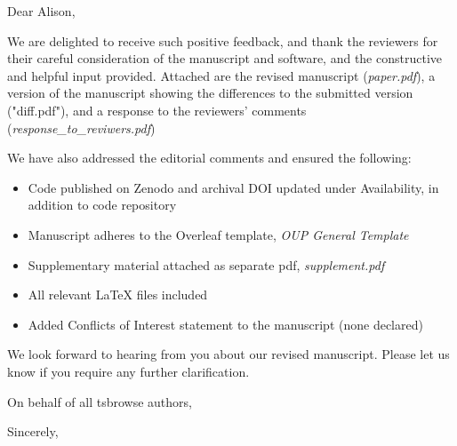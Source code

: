 \documentclass{letter}
\begin{document}
\begin{letter}{}

\opening{Dear Alison,}

We are delighted to receive such positive feedback, and thank the reviewers for their 
careful consideration of the manuscript and software, and the constructive and helpful 
input provided. Attached are the revised manuscript (\textit{paper.pdf}), 
a version of the manuscript showing the differences to the submitted version ("diff.pdf"), 
and a response to the reviewers' comments (\textit{response\_to\_reviwers.pdf})

We have also addressed the editorial comments and ensured the following:
\begin{itemize}
    \item Code published on Zenodo and archival DOI updated 
    under Availability, in addition to code repository
    \item Manuscript adheres to the Overleaf template, \textit{OUP General Template}
    \item Supplementary material attached as separate pdf, \textit{supplement.pdf}
    \item All relevant LaTeX files included
    \item Added Conflicts of Interest statement to the manuscript (none declared)
\end{itemize}

We look forward to hearing from you about our revised manuscript. Please let us know if you require any 
further clarification.

On behalf of all tsbrowse authors,
\closing{Sincerely,}

\end{letter}
\end{document}
